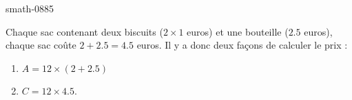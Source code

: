 
\begin{corrige}{smath-0885}

    Chaque sac contenant deux biscuits (\( 2\times 1\) euros) et une bouteille (\( 2.5\) euros), chaque sac coûte \( 2+2.5=4.5\) euros. Il y a donc deux façons de calculer le prix :
    \begin{enumerate}
        \item
            \( A=12\times (2+2.5)\)
        \item
            \( C=12\times 4.5\).
    \end{enumerate}

\end{corrige}

